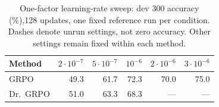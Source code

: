 \begin{table}[t]
\centering
\caption{One-factor learning-rate sweep: dev 300 accuracy (\%),128 updates, one fixed reference run per condition. Dashes denote unrun settings, not zero accuracy. Other settings remain fixed within each method.}
\label{tab:rates}
\footnotesize
\setlength{\tabcolsep}{4pt}
\begin{tabular}{lrrrrr}
\toprule
Method & $2\cdot10^{-7}$ & $5\cdot10^{-7}$ & $10^{-6}$ & $2\cdot10^{-6}$ & $3\cdot10^{-6}$\\
\midrule
GRPO & 49.3 & 61.7 & 72.3 & 70.0 & 75.0\\
Dr.~GRPO & 51.0 & 63.3 & 68.3 & --- & ---\\
\bottomrule
\end{tabular}
\end{table}
